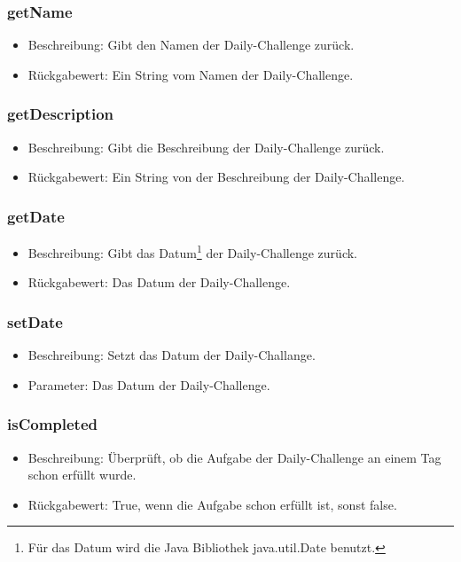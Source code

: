\documentclass[a4paper]{scrreprt}
\begin{document}
	\subsubsection{getName}
	\begin{itemize}
		\item Beschreibung: Gibt den Namen der Daily-Challenge zurück.
		\item Rückgabewert: Ein String vom Namen der Daily-Challenge.
	\end{itemize}
	\subsubsection{getDescription}
	\begin{itemize}
		\item Beschreibung: Gibt die Beschreibung der Daily-Challenge zurück.
		\item Rückgabewert: Ein String von der Beschreibung der Daily-Challenge.
	\end{itemize}
	\subsubsection{getDate}
	\begin{itemize}
		\item Beschreibung: Gibt das Datum\footnote{Für das Datum wird die Java Bibliothek java.util.Date benutzt.} der Daily-Challenge zurück.
		\item Rückgabewert: Das Datum der Daily-Challenge.
	\end{itemize}
	\subsubsection{setDate}
	\begin{itemize}
		\item Beschreibung: Setzt das Datum der Daily-Challange.
		\item Parameter: Das Datum der Daily-Challenge.
	\end{itemize}
	\subsubsection{isCompleted}
	\begin{itemize}
		\item Beschreibung: Überprüft, ob die Aufgabe der Daily-Challenge an einem Tag schon erfüllt wurde.
		\item Rückgabewert: True, wenn die Aufgabe schon erfüllt ist, sonst false.
	\end{itemize}
\end{document}
